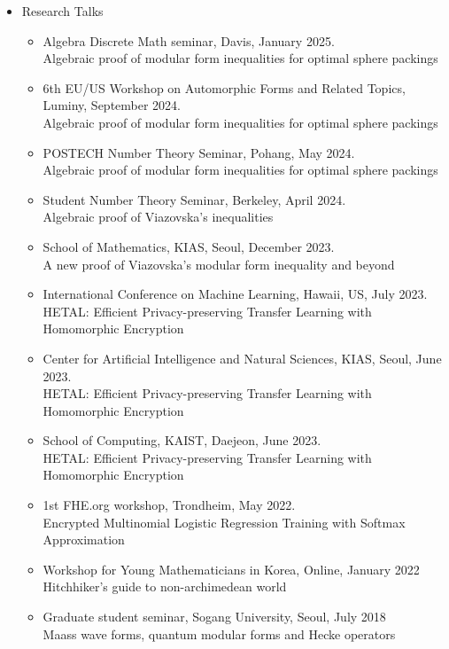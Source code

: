 \documentclass[letterpaper,11pt]{article}
\newlength{\outerbordwidth}
\newcommand{\resheading}[1]{\vspace{8pt}
  \parbox{\textwidth}{\setlength{\FrameSep}{\outerbordwidth}
    \begin{shaded}
\setlength{\fboxsep}{0pt}\framebox[\textwidth][l]{\setlength{\fboxsep}{4pt}\fcolorbox{shadecolorB}{shadecolorB}{\textbf{\sffamily{\mbox{~}\makebox[6.762in][l]{\large #1} \vphantom{p\^{E}}}}}}
    \end{shaded}
  }\vspace{-5pt}
}
\begin{document}
\resheading{Talks}
\begin{itemize}
	\item Research Talks
	\begin{itemize}
		\item Algebra Discrete Math seminar, Davis, January 2025.\\
		Algebraic proof of modular form inequalities for optimal sphere packings 
		\item 6th EU/US Workshop on Automorphic Forms and Related Topics, Luminy, September 2024.\\
		Algebraic proof of modular form inequalities for optimal sphere packings 
		\item POSTECH Number Theory Seminar, Pohang, May 2024.\\
		Algebraic proof of modular form inequalities for optimal sphere packings 
		\item Student Number Theory Seminar, Berkeley, April 2024.\\
		Algebraic proof of Viazovska's inequalities
		\item School of Mathematics, KIAS, Seoul, December 2023. \\
		A new proof of Viazovska's modular form inequality and beyond
		\item International Conference on Machine Learning, Hawaii, US, July 2023.\\
		HETAL: Efficient Privacy-preserving Transfer Learning with Homomorphic Encryption
		\item Center for Artificial Intelligence and Natural Sciences, KIAS, Seoul, June 2023.\\
		HETAL: Efficient Privacy-preserving Transfer Learning with Homomorphic Encryption
		\item School of Computing, KAIST, Daejeon, June 2023. \\
		HETAL: Efficient Privacy-preserving Transfer Learning with Homomorphic Encryption
		\item 1st FHE.org workshop, Trondheim, May 2022.\\
		Encrypted Multinomial Logistic Regression Training with Softmax Approximation
		\item Workshop for Young Mathematicians in Korea, Online, January 2022 \\
		Hitchhiker's guide to non-archimedean world
		\item Graduate student seminar, Sogang University, Seoul, July 2018\\
		Maass wave forms, quantum modular forms and Hecke operators

\end{itemize}
\end{itemize}
\end{document}
